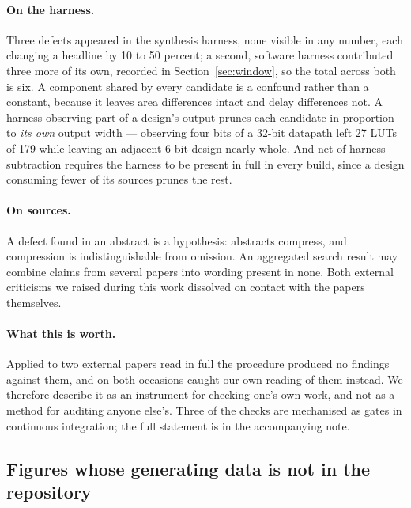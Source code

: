 \paragraph{On the harness.} Three defects appeared in the synthesis harness, none
visible in any number, each changing a headline by 10 to 50 percent; a second,
software harness contributed three more of its own, recorded in
Section~\ref{sec:window}, so the total across both is six. A component shared by every
candidate is a confound rather than a constant, because it leaves area
differences intact and delay differences not. A harness observing part of a
design's output prunes each candidate in proportion to \emph{its own} output
width --- observing four bits of a 32-bit datapath left 27 LUTs of 179 while
leaving an adjacent 6-bit design nearly whole. And net-of-harness subtraction
requires the harness to be present in full in every build, since a design
consuming fewer of its sources prunes the rest.

\paragraph{On sources.} A defect found in an abstract is a hypothesis: abstracts
compress, and compression is indistinguishable from omission. An aggregated
search result may combine claims from several papers into wording present in
none. Both external criticisms we raised during this work dissolved on contact
with the papers themselves.


\paragraph{What this is worth.} Applied to two external papers read in full the
procedure produced no findings against them, and on both occasions caught our own
reading of them instead. We
therefore describe it as an instrument for checking one's own work, and not as a
method for auditing anyone else's. Three of the checks are mechanised as gates in
continuous integration; the full statement is in the accompanying note.





\subsection{Figures whose generating data is not in the repository}
\label{sec:provenance}


